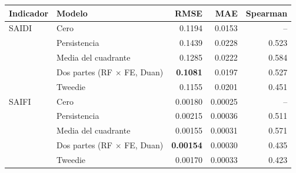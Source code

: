 \begin{tabular}{l l r r r}
\toprule
\textbf{Indicador} & \textbf{Modelo} & \textbf{RMSE} & \textbf{MAE} & \textbf{Spearman} \\
\midrule
SAIDI & Cero & 0.1194 & 0.0153 & -- \\
 & Persistencia & 0.1439 & 0.0228 & 0.523 \\
 & Media del cuadrante & 0.1285 & 0.0222 & 0.584 \\
 & Dos partes (RF $\times$ FE, Duan) & \textbf{0.1081} & 0.0197 & 0.527 \\
 & Tweedie & 0.1155 & 0.0201 & 0.451 \\
\addlinespace
SAIFI & Cero & 0.00180 & 0.00025 & -- \\
 & Persistencia & 0.00215 & 0.00036 & 0.511 \\
 & Media del cuadrante & 0.00155 & 0.00031 & 0.571 \\
 & Dos partes (RF $\times$ FE, Duan) & \textbf{0.00154} & 0.00030 & 0.435 \\
 & Tweedie & 0.00170 & 0.00033 & 0.423 \\
\bottomrule
\end{tabular}
